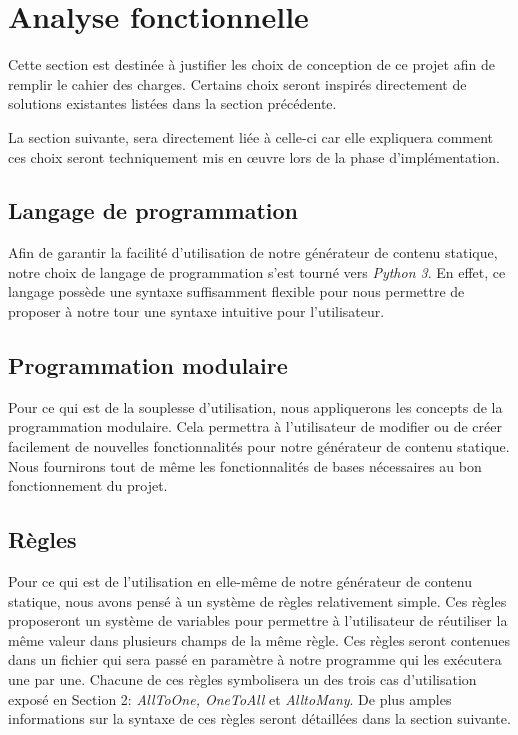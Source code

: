 \section{Analyse fonctionnelle}

	Cette section est destinée à justifier les choix de conception de ce projet afin de remplir le cahier des charges. Certains choix seront inspirés directement de solutions existantes listées dans la section précédente.
	
	La section suivante, sera directement liée à celle-ci car elle expliquera comment ces choix seront techniquement mis en œuvre lors de la phase d'implémentation.

	\subsection{Langage de programmation}
		Afin de garantir la facilité d'utilisation de notre générateur de contenu statique, notre choix de langage de programmation s'est tourné vers \textit{Python 3}. En effet, ce langage possède une syntaxe suffisamment flexible pour nous permettre de proposer à notre tour une syntaxe intuitive pour l'utilisateur.
		
	\subsection{Programmation modulaire}
		Pour ce qui est de la souplesse d'utilisation, nous appliquerons les concepts de la programmation modulaire. Cela permettra à l'utilisateur de modifier ou de créer facilement de nouvelles fonctionnalités pour notre générateur de contenu statique. Nous fournirons tout de même les fonctionnalités de bases nécessaires au bon fonctionnement du projet.

	\subsection{Règles}
		Pour ce qui est de l'utilisation en elle-même de notre générateur de contenu statique, nous avons pensé à un système de règles relativement simple. Ces règles proposeront un système de variables pour permettre à l'utilisateur de réutiliser la même valeur dans plusieurs champs de la même règle. Ces règles seront contenues dans un fichier qui sera passé en paramètre à notre programme qui les exécutera une par une. Chacune de ces règles symbolisera un des trois cas d'utilisation exposé en Section 2: \textit{AllToOne, OneToAll} et \textit{AlltoMany}. De plus amples informations sur la syntaxe de ces règles seront détaillées dans la section suivante.
	
